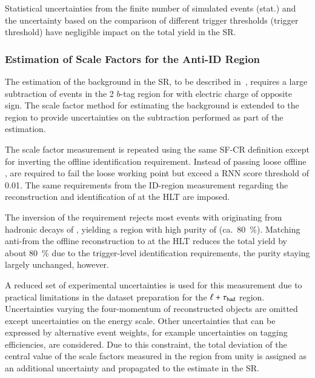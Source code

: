 Statistical uncertainties from the finite number of simulated events
(stat.) and the uncertainty based on the comparison of different
trigger thresholds (trigger threshold) have negligible impact on the
total yield in the \hadhad SR.



\subsubsection{Estimation of \faketauhadvis Scale Factors for the Anti-ID
  Region}

The estimation of the \multijet background in the \hadhad SR, to be
described in~, requires a large subtraction of
\ttbarFakes events in the 2 $b$-tag \antiid region for \tauhadvis with
electric charge of opposite sign. The scale factor method for
estimating the \ttbarFakes background is extended to the \antiid
region to provide uncertainties on the subtraction performed as part
of the \multijet estimation.

The scale factor measurement is repeated using the same SF-CR
definition except for inverting the offline \tauhadvis identification
requirement. Instead of \tauhadvis passing loose offline \tauid,
\tauhadvis are required to fail the loose working point but exceed a
RNN \tauid score threshold of \num{0.01}. The same requirements from
the ID-region measurement regarding the reconstruction and
identification of \tauhadvis at the HLT are imposed.

The inversion of the \tauid requirement rejects most \ttbar events
with \tauhadvis originating from hadronic decays of \tauleptons,
yielding a region with high purity of \ttbarFakes
(ca.~\SI{80}{\percent}). Matching anti-\tauhadvis from the offline
reconstruction to \tauhadvis at the HLT reduces the total \ttbarFakes
yield by about \SI{80}{\percent} due to the trigger-level
identification requirements, the \ttbarFakes purity staying largely
unchanged, however.

A reduced set of experimental uncertainties is used for this
measurement due to practical limitations in the dataset preparation
for the $\ell + \tau_{\text{had}}$ \antiid region. Uncertainties varying the
four-momentum of reconstructed objects are omitted except
uncertainties on the \tauhadvis energy scale. Other uncertainties that
can be expressed by alternative event weights, for example
uncertainties on tagging efficiencies, are considered. Due to this
constraint, the total deviation of the central value of the scale
factors measured in the \antiid region from unity is assigned as an
additional uncertainty and propagated to the \multijet estimate in the
\hadhad SR.


